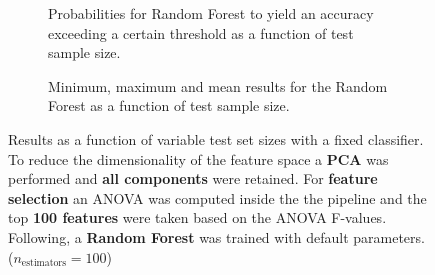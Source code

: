 \begin{figure}
    \captionsetup[subfigure]{justification=justified,singlelinecheck=false}
    \begin{subfigure}[t]{0.61\textwidth}
        
        \caption{Probabilities for Random Forest to yield an accuracy exceeding a certain threshold as a function of test sample size.}
    \end{subfigure}
    \hspace{3.0mm}
    \begin{subfigure}[t]{0.34\textwidth}
        
        \caption{Minimum, maximum and mean results for the Random Forest as a function of test sample size.}
    \end{subfigure}
    \caption[Effects of varying test sample size. Random Forest; Preprocessing: PCA ($n_\text{components} = \text{all}$); ANOVA feature selection ($k_\text{best} = \num{100}$)]{Results as a function of variable test set sizes with a fixed classifier. To reduce the dimensionality of the feature space a \textbf{PCA} was performed and \textbf{all components} were retained. For \textbf{feature selection} an ANOVA was computed inside the the pipeline and the top \textbf{100 features} were taken based on the ANOVA F-values. Following, a \textbf{{Random Forest}} was trained with default parameters. ($n_\text{estimators}=\num{100}$)}
    \label{fig:PCA_all_components_100_best_selected_RandomForest}
\end{figure}

